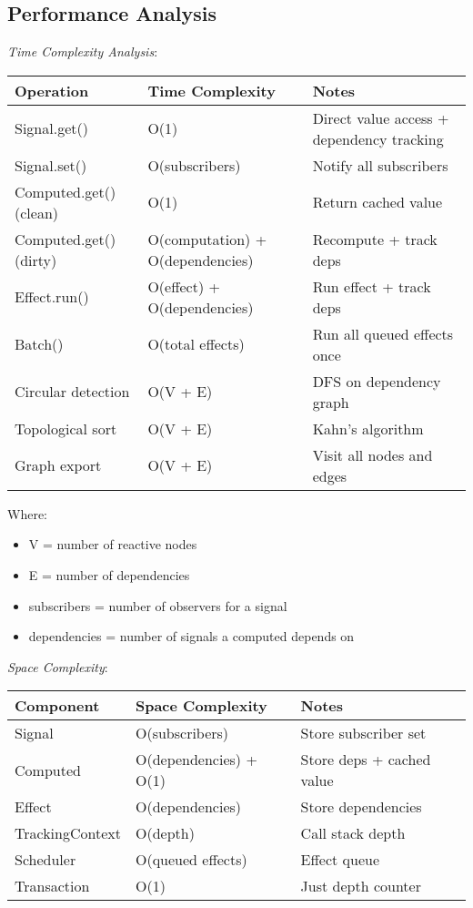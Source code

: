 \documentclass[11pt]{article}
\begin{document}
\subsection{Performance Analysis}
\label{sec:orge1f5478}

\emph{Time Complexity Analysis}:

\begin{center}
\begin{tabular}{lll}
Operation & Time Complexity & Notes\\
\hline
Signal.get() & O(1) & Direct value access + dependency tracking\\
Signal.set() & O(subscribers) & Notify all subscribers\\
Computed.get() (clean) & O(1) & Return cached value\\
Computed.get() (dirty) & O(computation) + O(dependencies) & Recompute + track deps\\
Effect.run() & O(effect) + O(dependencies) & Run effect + track deps\\
Batch() & O(total effects) & Run all queued effects once\\
Circular detection & O(V + E) & DFS on dependency graph\\
Topological sort & O(V + E) & Kahn's algorithm\\
Graph export & O(V + E) & Visit all nodes and edges\\
\end{tabular}
\end{center}

Where:
\begin{itemize}
\item V = number of reactive nodes
\item E = number of dependencies
\item subscribers = number of observers for a signal
\item dependencies = number of signals a computed depends on
\end{itemize}

\emph{Space Complexity}:

\begin{center}
\begin{tabular}{lll}
Component & Space Complexity & Notes\\
\hline
Signal & O(subscribers) & Store subscriber set\\
Computed & O(dependencies) + O(1) & Store deps + cached value\\
Effect & O(dependencies) & Store dependencies\\
TrackingContext & O(depth) & Call stack depth\\
Scheduler & O(queued effects) & Effect queue\\
Transaction & O(1) & Just depth counter\\
\end{tabular}
\end{center}
\end{document}
